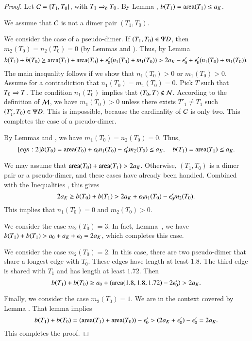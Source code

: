 \begin{proof}  Let $\mathcal C = \{T_1,T_0\}$, with $T_1\Rightarrow_{b} T_0$. By Lemma ,
$b(T_1)={\operatorname{area}}(T_1)\le a_K$.  

We assume that $\mathcal C$ is not a dimer pair $(T_1,T_0)$.


We consider the case of a pseudo-dimer.
If $(T_1,T_0)\in\Psi D$, then $m_2(T_0)=n_2(T_0)=0$ (by Lemmas  and ).
Thus, by Lemma 
\[
b(T_1)+b(T_0) \ge {\operatorname{area}}(T_1)+{\operatorname{area}}(T_0) + \epsilon_0' (n_1(T_0) + m_1(T_0)) > 2a_K - \epsilon_0'  + \epsilon_0' (n_1(T_0)+m_1(T_0)).
\]
The main inequality follows if we show that $n_1(T_0)>0$ or $m_1(T_0)>0$.
Assume for a contradiction that $n_1(T_0)=m_1(T_0)=0$.  Pick $T$ such that $T_0\Rightarrow T$.
The condition $n_1(T_0)$ implies that $(T_0,T)\not\in\mathcal N$.  According to the definition of $\mathcal M$, 
we have $m_1(T_0)>0$ unless
there exists $T'_1\ne T_1$ such $(T'_1,T_0)\in\Psi D$.  This is impossible, because the cardinality of $\mathcal C$ is only
two.  This completes the case of a pseudo-dimer.

By Lemmas  and , we have $m_1(T_0)=n_2(T_0)=0$.
Thus,
\begin{equation}\libel{eqn:2}
b(T_0) = \area(T_0) + \epso n_1(T_0) - \epso' m_2(T_0)\le \aK, \quad b(T_1) = \area(T_1) \le \aK.
\end{equation}

We may assume that  ${\operatorname{area}}(T_0)+{\operatorname{area}}(T_1)> 2a_K$.  Otherwise, $(T_1,T_0)$ is a dimer pair or 
a pseudo-dimer, and these cases have already been handled.  Combined with the Inequalities ,
this gives 
\[
2a_K \ge b(T_0) + b(T_1) > 2a_K + \epsilon_0 n_1(T_0) - \epsilon_0' m_2(T_0).
\]
This implies that $n_1(T_0)=0$ and $m_2(T_0) > 0$.

We consider the case $m_2(T_0)= 3$.  In fact, Lemma~, we have
$b(T_1) + b(T_1) > a_0 + a_K + \epsilon_0 = 2a_K$, which completes this case.

We consider the case $m_2(T_0)=2$.  In this case, there are two pseudo-dimer that share
a longest edge with $T_0$.  These edges have length at least $1.8$. The third edge
is shared with $T_1$ and has length at least $1.72$.
Then
\[
b(T_1)+b(T_0) \ge a_0 + ({\operatorname{area}} (1.8,1.8,1.72) - 2\epsilon_0') > 2a_K.
\]

Finally, we consider the case $m_2(T_0)=1$.  We are in the context covered
by Lemma .  That lemma implies
\[
b(T_1) + b(T_0) = ({\operatorname{area}}(T_1) + {\operatorname{area}}(T_0)) - \epsilon_0' > (2a_K  +\epsilon_0') - \epsilon_0' = 2a_K.
\]
This completes the proof.
\end{proof}


